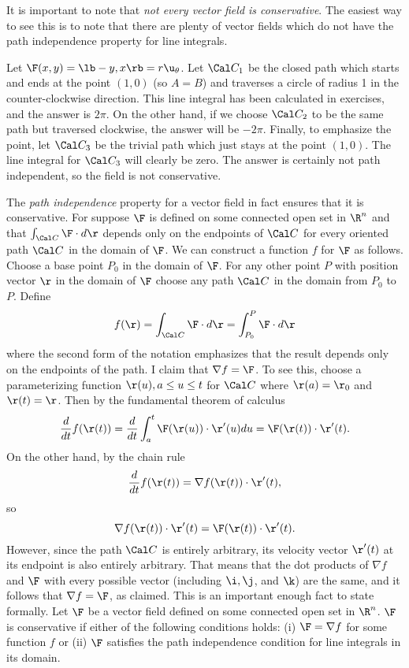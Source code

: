 It is important to note that {\it not every vector field is
conservative}.  The easiest way to see this is to note that
there are plenty of vector fields which do not have the
path independence property for line integrals.   

\nextex
{}  Let $\F(x,y) = \lb -y, x \rb = r\u_{\theta}$.
Let $\Cal C_1$ be the closed path which starts and ends at the
point $(1,0)$ (so $A = B$) and traverses a circle of radius 1
in the counter-clockwise direction.  This line integral has
been calculated in exercises, and the answer is $2\pi$.  On the
other hand, if we choose $\Cal C_2$ to be the same path but
traversed clockwise, the answer will be $-2\pi$.  Finally,
to emphasize the point, let $\Cal C_3$ be the trivial path
which just stays at the point $(1,0)$.  The line integral for
$\Cal C_3$ will clearly be zero.  The answer is certainly not
path independent, so the field is not conservative.
\endexample

The {\it path independence\/} property for a vector field
in fact ensures that it is conservative.  For suppose
$\F$ is defined on some connected open set in $\R^n$
and that $\int_{\Cal C} \F\cdot d\r$ depends only on the
endpoints of $\Cal C$ for every oriented path $\Cal C$ in
the domain of $\F$.   We can construct a function
$f$ for $\F$ as follows.  Choose a base point $P_0$ in the
domain of $\F$.   For any other point $P$ with position
vector $\r$ in the domain of $\F$ choose any path
$\Cal C$ in the domain from $P_0$ to $P$.  Define
$$
    f(\r) = \int_{\Cal C}\F\cdot d\r = \int_{P_0}^P \F\cdot d\r
$$
where the second form of the notation emphasizes that the result
depends only on the endpoints of the path.  I claim that
$\nabla f = \F$.   To see this, choose a parameterizing
function 
$\r(u), a \le u \le t$ for $\Cal C$ where $\r(a) = \r_0$ and
$\r(t) = \r$.   Then by the fundamental theorem of calculus
$$
   \frac d{dt} f(\r(t)) = \frac d{dt}\int_a^t \F(\r(u))\cdot \r'(u) du
    = \F(\r(t))\cdot \r'(t).
$$
On the other hand, by the chain rule
$$
    \frac d{dt} f(\r(t)) = \nabla f(\r(t))\cdot \r'(t),
$$
so
$$
    \nabla f(\r(t))\cdot \r'(t)
    = \F(\r(t))\cdot \r'(t).
$$
However, since the path $\Cal C$ is entirely arbitrary, its velocity
vector $\r'(t)$ at its endpoint is also entirely arbitrary.   That means
that the dot products of $\nabla f$ and $\F$ with every possible vector
(including $\i, \j$, and $\k$) are the same, and it follows that
$\nabla f = \F$, as claimed.  This is an important enough fact to
state formally.
\smallskip
{}
\smallskip
\nextthm
{}  Let $\F$ be a vector field defined on
some connected open set in $\R^n$.   $\F$ is conservative if either
of the following conditions holds:  (i) $\F = \nabla f$ for some
function $f$ or (ii) $\F$ satisfies the path independence
condition for line integrals in its domain.
\endproclaim

